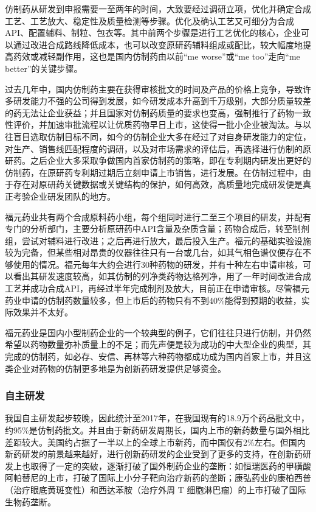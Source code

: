 \documentclass{apa6}
\begin{document}
			仿制药从研发到申报需要一至两年的时间，大致要经过调研立项，优化并确定合成工艺、工艺放大、稳定性及质量检测等步骤\citep{RN22}。优化及确认工艺又可细分为合成API、配置辅料、制粒、包衣等。其中前两个步骤是进行工艺优化的核心，企业可以通过改进合成路线降低成本，也可以改变原研药辅料组成或配比，较大幅度地提高药效或减轻副作用，这也是国内仿制药由以前“me worse”或“me too”走向“me better”的关键步骤\citep{RN12}。
			
			过去几年中，国内仿制药主要在获得审核批文的时间及产品的价格上竞争，导致许多研发能力不强的公司得到发展，如今研发成本升高到千万级别，大部分质量较差的药无法让企业获益；并且国家对仿制药质量的要求也变高，强制推行了药物一致性评价，并加速审批流程以让优质药物早日上市，这使得一批小企业被淘汰。与以往盲目选取仿制目标不同，如今的仿制企业大多在经过了对自身研发能力的定位，对生产、销售线匹配程度的调研，以及对市场需求的评估后，再选择进行仿制的原研药。之后企业大多采取争做国内首家仿制药的策略，即在专利期内研发出更好的仿制药，在原研药专利期过期后立刻申请上市销售，进行发展。在仿制过程中，由于存在对原研药关键数据或关键结构的保护，如何高效，高质量地完成研发便是真正考验企业研发团队的地方。
			
			福元药业共有两个合成原料药小组，每个组同时进行二至三个项目的研发，并配有专门的分析部门，主要分析原研药中API含量及杂质含量；药物合成后，转至制剂组，尝试对辅料进行改进；之后再进行放大，最后投入生产。福元的基础实验设施较为完备，但某些相对昂贵的仪器往往只有一台或几台，如其气相色谱仪便存在不够使用的情况。福元每年大约会进行30种药物的研发，并有十种左右申请审核，可以看出其研发速度较高，如其仿制的列净类药物达格列净，用了一年时间改进合成工艺并成功合成API，再经过半年完成制剂及放大，目前正在申请审核。尽管福元药业申请的仿制药数量较多，但上市后的药物只有不到40\%能得到预期的收益，实际效果并不太好。
			
			福元药业是国内小型制药企业的一个较典型的例子，它们往往只进行仿制，并仍然希望以药物数量弥补质量上的不足；而先声便是较为成功的中大型企业的典型，其完成的仿制药，如必存、安信、再林等六种药物都成功成为国内首家上市，并且这类企业对药物的仿制更多地是为创新药研发提供足够资金。
			
			
			\subsubsection{自主研发}
			我国自主研发起步较晚，因此统计至2017年，在我国现有的18.9万个药品批文中，约95\%是仿制药批文\citep{RN21}。并且由于新药研发周期长，国内上市的新药数量与国外相比差距较大。美国约占据了一半以上的全球上市新药，而中国仅有2\%左右\citep{RN23}。但国内新药研发的前景越来越好，进行创新药研发的企业受到了更多的支持，在创新药研发上也取得了一定的突破，逐渐打破了国外制药企业的垄断：如恒瑞医药的甲磺酸阿帕替尼的上市，打破了国际上小分子靶向治疗新药的垄断；康弘药业的康柏西普（治疗眼底黄斑变性）和西达苯胺（治疗外周 T 细胞淋巴瘤）的上市打破了国际生物药垄断\citep{RN24}。
			
\end{document}
